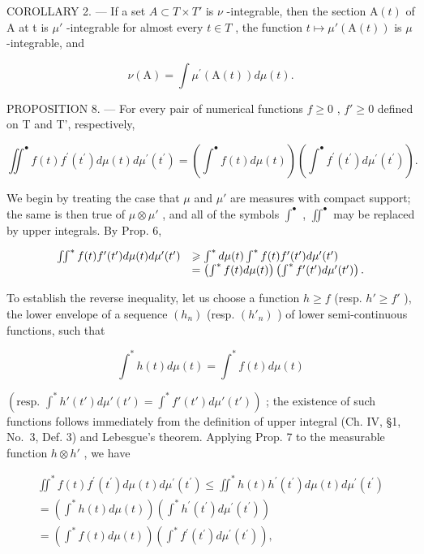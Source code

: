 COROLLARY 2. --- If a set \(A \subset T \times T'\) is \(\nu\) -integrable, then the section \(\mathrm{A}(t)\) of A at t is \(\mu'\) -integrable for almost every \(t \in T\) , the function \(t \mapsto \mu'(\mathrm{A}(t))\) is \(\mu\) -integrable, and

\[
\nu (\mathrm{A}) = \int \mu^ {\prime} (\mathrm{A} (t)) d \mu (t).\tag{9}
\]

PROPOSITION 8. --- For every pair of numerical functions \(f \geqslant 0\) , \(f' \geqslant 0\) defined on T and T', respectively,

\[
\iint^ {\bullet} f (t) f ^ {\prime} \left(t ^ {\prime}\right) d \mu (t) d \mu^ {\prime} \left(t ^ {\prime}\right) = \left(\int^ {\bullet} f (t) d \mu (t)\right) \left(\int^ {\bullet} f ^ {\prime} \left(t ^ {\prime}\right) d \mu^ {\prime} \left(t ^ {\prime}\right)\right).\tag{10}
\]

We begin by treating the case that \(\mu\) and \(\mu'\) are measures with compact support; the same is then true of \(\mu \otimes \mu'\) , and all of the symbols \(\int^{\bullet}\) , \(\iint^{\bullet}\) may be replaced by upper integrals. By Prop. 6,

\[
\begin{array}{r l} \iint^ {*} f (t) f ^ {\prime} (t ^ {\prime}) d \mu (t) d \mu^ {\prime} (t ^ {\prime}) & \geqslant \int^ {*} d \mu (t) \int^ {*} f (t) f ^ {\prime} (t ^ {\prime}) d \mu^ {\prime} (t ^ {\prime}) \\ & = \left(\int^ {*} f (t) d \mu (t)\right) \left(\int^ {*} f ^ {\prime} (t ^ {\prime}) d \mu^ {\prime} (t ^ {\prime})\right). \end{array}
\]

To establish the reverse inequality, let us choose a function \(h \geqslant f\) (resp. \(h' \geqslant f'\) ), the lower envelope of a sequence \((h_n)\) (resp. \((h'_n)\) ) of lower semi-continuous functions, such that

\[
\int^ {*} h (t) d \mu (t) = \int^ {*} f (t) d \mu (t)
\]

\((\text{resp. } \int^{*} h'(t') d\mu'(t') = \int^{*} f'(t') d\mu'(t'))\) ; the existence of such functions follows immediately from the definition of upper integral (Ch. IV, §1, No.~3, Def. 3) and Lebesgue's theorem. Applying Prop. 7 to the measurable function \(h \otimes h'\) , we have

\[
\begin{array}{l} \iint^ {*} f (t) f ^ {\prime} (t ^ {\prime}) d \mu (t) d \mu^ {\prime} (t ^ {\prime}) \leqslant \iint^ {*} h (t) h ^ {\prime} (t ^ {\prime}) d \mu (t) d \mu^ {\prime} (t ^ {\prime}) \\ = \left(\int^ {*} h (t) d \mu (t)\right) \left(\int^ {*} h ^ {\prime} (t ^ {\prime}) d \mu^ {\prime} (t ^ {\prime})\right) \\ = \left(\int^ {*} f (t) d \mu (t)\right) \left(\int^ {*} f ^ {\prime} (t ^ {\prime}) d \mu^ {\prime} (t ^ {\prime})\right), \end{array}
\]

